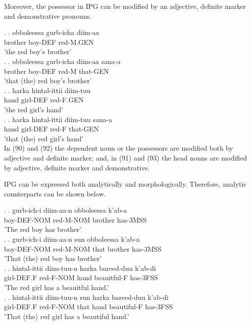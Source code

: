 \documentclass[11pt,a4paper]{article}
\begin{document}
	Moreover, the possessor in IPG can be modified by an adjective, definite marker and demonstrative pronouns.
	
	\ex.
	\ag.
	obboleessa   gurb-icha diim-aa\\
	brother 	boy-DEF red-M.GEN\\
	'the red boy's brother'\\
	
	\ex.
	\ag.
	obboleessa   gurb-icha diim-aa sana-a\\
	brother 	boy-DEF red-M that-GEN\\
	'that (the) red boy's brother'\\
	
	\ex.
	\ag.
	harka hintal-ittii diim-tuu\\
	hand girl-DEF red-F.GEN\\
	'the red girl's hand'\\
	
	\ex.
	\ag.
	harka hintal-ittii diim-tuu sana-a\\
	hand girl-DEF red-F that-GEN\\
	'that (the) red girl's hand'\\
	
	In (90) and (92) the dependent noun or the possessors are modified both by adjective and definite marker; and, in (91) and (93) the head nouns are modified by adjective, definite marker and demonstrative. 
	
	IPG can be expressed both analytically and morphologically. Therefore, analytic counterparts can be shown below.
	
	\ex.
	\ag.
	gurb-ich-i diim-aa-n obboleessa k'ab-a\\
	boy-DEF-NOM red-M-NOM brother has-3MSS\\
	'The red boy has brother'\\
	
	\ex.
	\ag.
	gurb-ich-i diim-aa-n sun obboleessa k'ab-a\\
	boy-DEF-NOM red-M-NOM that brother has-3MSS\\
	'That (the) red boy has brother'\\
	
	\ex.
	\ag.
	hintal-ittii diim-tuu-n harka bareed-duu k'ab-di\\
	girl-DEF.F red-F-NOM hand beauitful-F has-3FSS\\
	'The red girl has a beauitful  hand.'\\
	
		
	\ex.
	\ag.
	hintal-ittii diim-tuu-n sun  harka bareed-duu k'ab-di\\
	girl-DEF.F red-F-NOM that hand beautiful-F has-3FSS\\
	'That (the) red girl has a beautiful  hand.'\\
	
\end{document}
